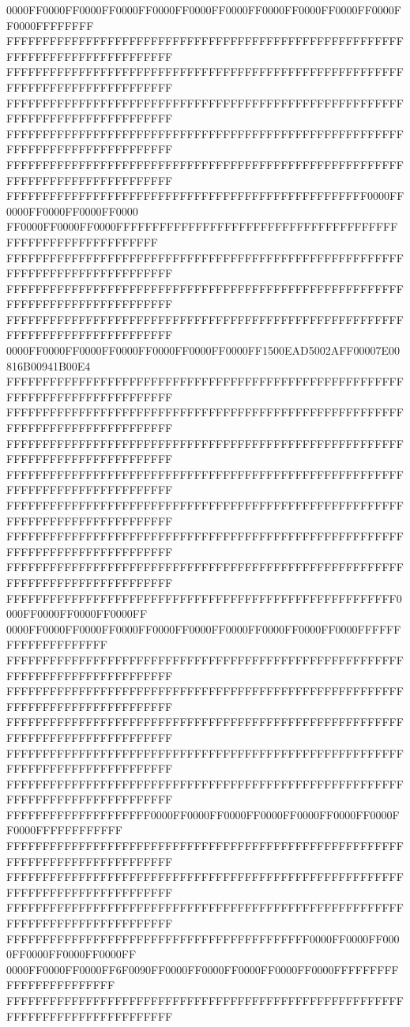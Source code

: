 0000FF0000FF0000FF0000FF0000FF0000FF0000FF0000FF0000FF0000FF0000FF0000FFFFFFFF
FFFFFFFFFFFFFFFFFFFFFFFFFFFFFFFFFFFFFFFFFFFFFFFFFFFFFFFFFFFFFFFFFFFFFFFFFFFFFF
FFFFFFFFFFFFFFFFFFFFFFFFFFFFFFFFFFFFFFFFFFFFFFFFFFFFFFFFFFFFFFFFFFFFFFFFFFFFFF
FFFFFFFFFFFFFFFFFFFFFFFFFFFFFFFFFFFFFFFFFFFFFFFFFFFFFFFFFFFFFFFFFFFFFFFFFFFFFF
FFFFFFFFFFFFFFFFFFFFFFFFFFFFFFFFFFFFFFFFFFFFFFFFFFFFFFFFFFFFFFFFFFFFFFFFFFFFFF
FFFFFFFFFFFFFFFFFFFFFFFFFFFFFFFFFFFFFFFFFFFFFFFFFFFFFFFFFFFFFFFFFFFFFFFFFFFFFF
FFFFFFFFFFFFFFFFFFFFFFFFFFFFFFFFFFFFFFFFFFFFFFFFFF0000FF0000FF0000FF0000FF0000
FF0000FF0000FF0000FFFFFFFFFFFFFFFFFFFFFFFFFFFFFFFFFFFFFFFFFFFFFFFFFFFFFFFFFFFF
FFFFFFFFFFFFFFFFFFFFFFFFFFFFFFFFFFFFFFFFFFFFFFFFFFFFFFFFFFFFFFFFFFFFFFFFFFFFFF
FFFFFFFFFFFFFFFFFFFFFFFFFFFFFFFFFFFFFFFFFFFFFFFFFFFFFFFFFFFFFFFFFFFFFFFFFFFFFF
FFFFFFFFFFFFFFFFFFFFFFFFFFFFFFFFFFFFFFFFFFFFFFFFFFFFFFFFFFFFFFFFFFFFFFFFFFFFFF
0000FF0000FF0000FF0000FF0000FF0000FF0000FF1500EAD5002AFF00007E00816B00941B00E4
FFFFFFFFFFFFFFFFFFFFFFFFFFFFFFFFFFFFFFFFFFFFFFFFFFFFFFFFFFFFFFFFFFFFFFFFFFFFFF
FFFFFFFFFFFFFFFFFFFFFFFFFFFFFFFFFFFFFFFFFFFFFFFFFFFFFFFFFFFFFFFFFFFFFFFFFFFFFF
FFFFFFFFFFFFFFFFFFFFFFFFFFFFFFFFFFFFFFFFFFFFFFFFFFFFFFFFFFFFFFFFFFFFFFFFFFFFFF
FFFFFFFFFFFFFFFFFFFFFFFFFFFFFFFFFFFFFFFFFFFFFFFFFFFFFFFFFFFFFFFFFFFFFFFFFFFFFF
FFFFFFFFFFFFFFFFFFFFFFFFFFFFFFFFFFFFFFFFFFFFFFFFFFFFFFFFFFFFFFFFFFFFFFFFFFFFFF
FFFFFFFFFFFFFFFFFFFFFFFFFFFFFFFFFFFFFFFFFFFFFFFFFFFFFFFFFFFFFFFFFFFFFFFFFFFFFF
FFFFFFFFFFFFFFFFFFFFFFFFFFFFFFFFFFFFFFFFFFFFFFFFFFFFFFFFFFFFFFFFFFFFFFFFFFFFFF
FFFFFFFFFFFFFFFFFFFFFFFFFFFFFFFFFFFFFFFFFFFFFFFFFFFFFF0000FF0000FF0000FF0000FF
0000FF0000FF0000FF0000FF0000FF0000FF0000FF0000FF0000FF0000FFFFFFFFFFFFFFFFFFFF
FFFFFFFFFFFFFFFFFFFFFFFFFFFFFFFFFFFFFFFFFFFFFFFFFFFFFFFFFFFFFFFFFFFFFFFFFFFFFF
FFFFFFFFFFFFFFFFFFFFFFFFFFFFFFFFFFFFFFFFFFFFFFFFFFFFFFFFFFFFFFFFFFFFFFFFFFFFFF
FFFFFFFFFFFFFFFFFFFFFFFFFFFFFFFFFFFFFFFFFFFFFFFFFFFFFFFFFFFFFFFFFFFFFFFFFFFFFF
FFFFFFFFFFFFFFFFFFFFFFFFFFFFFFFFFFFFFFFFFFFFFFFFFFFFFFFFFFFFFFFFFFFFFFFFFFFFFF
FFFFFFFFFFFFFFFFFFFFFFFFFFFFFFFFFFFFFFFFFFFFFFFFFFFFFFFFFFFFFFFFFFFFFFFFFFFFFF
FFFFFFFFFFFFFFFFFFFF0000FF0000FF0000FF0000FF0000FF0000FF0000FF0000FFFFFFFFFFFF
FFFFFFFFFFFFFFFFFFFFFFFFFFFFFFFFFFFFFFFFFFFFFFFFFFFFFFFFFFFFFFFFFFFFFFFFFFFFFF
FFFFFFFFFFFFFFFFFFFFFFFFFFFFFFFFFFFFFFFFFFFFFFFFFFFFFFFFFFFFFFFFFFFFFFFFFFFFFF
FFFFFFFFFFFFFFFFFFFFFFFFFFFFFFFFFFFFFFFFFFFFFFFFFFFFFFFFFFFFFFFFFFFFFFFFFFFFFF
FFFFFFFFFFFFFFFFFFFFFFFFFFFFFFFFFFFFFFFFFF0000FF0000FF0000FF0000FF0000FF0000FF
0000FF0000FF0000FF6F0090FF0000FF0000FF0000FF0000FF0000FFFFFFFFFFFFFFFFFFFFFFFF
FFFFFFFFFFFFFFFFFFFFFFFFFFFFFFFFFFFFFFFFFFFFFFFFFFFFFFFFFFFFFFFFFFFFFFFFFFFFFF
